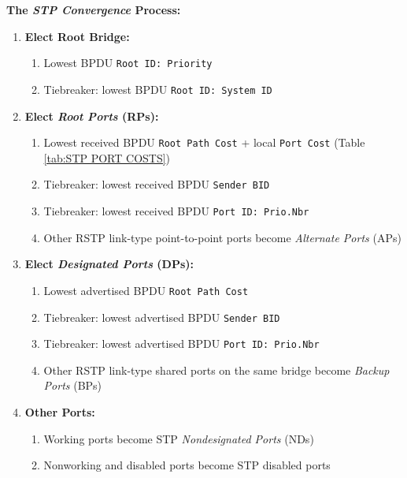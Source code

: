 \documentclass[12pt]{article}
\begin{document}
	\textbf{The \textit{STP Convergence} Process:}
	\begin{enumerate}
		\label{itm:STP CONVERGENCE}
		\item{\textbf{Elect Root Bridge:}}
		\begin{enumerate} \itemsep -5pt
			\item{Lowest BPDU \texttt{Root ID: Priority}}
			\item{Tiebreaker: lowest BPDU \texttt{Root ID: System ID}}
		\end{enumerate}
		\item{\textbf{Elect \textit{Root Ports} (RPs):}}
		\begin{enumerate} \itemsep -5pt
			\item{Lowest received BPDU \texttt{Root Path Cost} + local \texttt{Port Cost} (Table \ref{tab:STP PORT COSTS})}
			\item{Tiebreaker: lowest received BPDU \texttt{Sender BID}}
			\item{Tiebreaker: lowest received BPDU \texttt{Port ID: Prio.Nbr}}
			\item{Other RSTP link-type point-to-point ports become \textit{Alternate Ports} (APs)}
		\end{enumerate}
		\item{\textbf{Elect \textit{Designated Ports} (DPs):}}
		\begin{enumerate} \itemsep -5pt
			\item{Lowest advertised BPDU \texttt{Root Path Cost}}
			\item{Tiebreaker: lowest advertised BPDU \texttt{Sender BID}}
			\item{Tiebreaker: lowest advertised BPDU \texttt{Port ID: Prio.Nbr}}
			\item{Other RSTP link-type shared ports on the same bridge become \textit{Backup Ports} (BPs)}
		\end{enumerate}
		\item{\textbf{Other Ports:}}
		\begin{enumerate} \itemsep -5pt
			\item{Working ports become STP \textit{Nondesignated Ports} (NDs)}
			\item{Nonworking and disabled ports become STP disabled ports}
		\end{enumerate}
	\end{enumerate}
\end{document}
